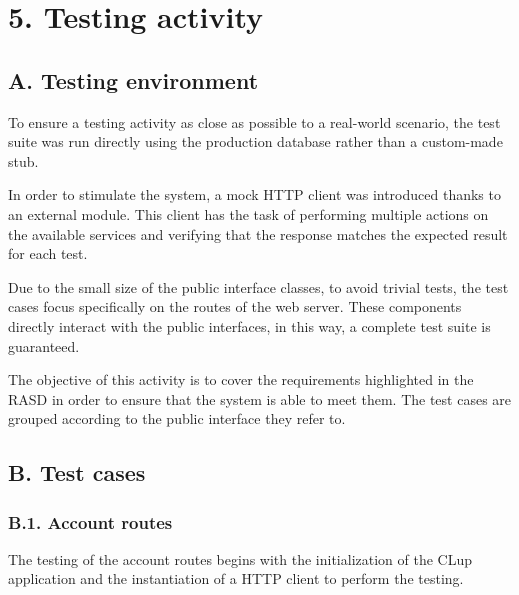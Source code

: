 \chapter{5. Testing activity}

\section{A. Testing environment}

To ensure a testing activity as close as possible to a real-world scenario, the test suite was run directly using the production database rather than a custom-made stub.

In order to stimulate the system, a mock HTTP client was introduced thanks to an external module.
This client has the task of performing multiple actions on the available services and verifying that the response matches the expected result for each test.

Due to the small size of the public interface classes, to avoid trivial tests, the test cases focus specifically on the routes of the web server.
These components directly interact with the public interfaces, in this way, a complete test suite is guaranteed.

The objective of this activity is to cover the requirements highlighted in the RASD in order to ensure that the system is able to meet them.
The test cases are grouped according to the public interface they refer to.

\clearpage
\section{B. Test cases}

\subsection{B.1. Account routes}

The testing of the account routes begins with the initialization of the CLup application and the instantiation of a HTTP client to perform the testing.

